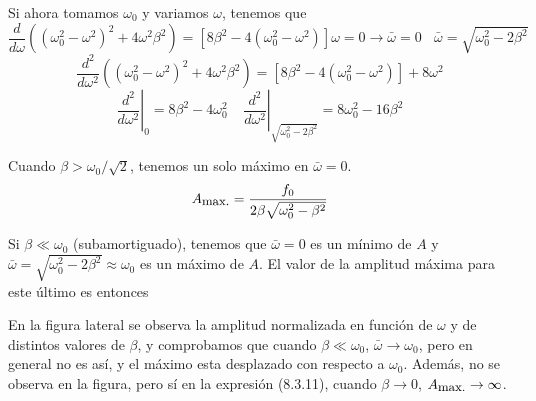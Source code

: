 Si ahora tomamos $\omega_0$ y variamos $\omega$, tenemos que
\begin{equation} \label{6.1.1}
    \frac{d}{d \omega} \left(\left(\omega_0^2 -\omega^2\right)^2+4\omega^2 \beta^2\right) =\left[8\beta^2-4\left(\omega_0^2 -\omega^2\right)\right]\omega = 0   \rightarrow \bar{\omega} = 0 \ \ \ \ \bar{\omega} =  \sqrt{\omega_0^2-2\beta^2}
\end{equation}
\[
    \frac{d^2}{d \omega^2} \left(\left(\omega_0^2 -\omega^2\right)^2+4\omega^2 \beta^2\right) = \left[8\beta^2-4\left(\omega_0^2 -\omega^2\right)\right] + 8\omega^2
\]
\begin{equation} \label{6.1.1}
    \left.\frac{d^2}{d \omega^2}\right|_0 = 8\beta^2 - 4\omega_0^2  \ \ \ \ \ \left.\frac{d^2}{d \omega^2}\right|_{\sqrt{\omega_0^2-2\beta^2}} = 8\omega_0^2-16\beta^2
\end{equation}
Cuando $\beta > \omega_0 /\sqrt{2}$, tenemos un solo máximo en $\bar{\omega} = 0$.
\begin{equation} \label{6.1.1}
    A_{\mbox{\small max.}} = \frac{f_0}{2\beta \sqrt{\omega_0^2-\beta^2}}
\end{equation}

Si $\beta \ll \omega_0$ (subamortiguado), tenemos que $\bar{\omega} = 0$ es un mínimo de $A$ y $\bar{\omega} = \sqrt{\omega_0^2-2\beta^2} \approx \omega_0$ es un máximo de $A$. El valor de la amplitud máxima para este último es entonces

En la figura lateral se observa la amplitud normalizada en función de  $\omega$ y de distintos valores de $\beta$, y comprobamos que cuando $\beta \ll \omega_0$, $\bar{\omega} \rightarrow \omega_0$, pero en general no es así, y el máximo esta desplazado con respecto a $\omega_0$.
Además, no se observa en la figura, pero sí en la expresión (8.3.11), cuando $\beta \rightarrow 0$, $A_{\mbox{\small max.}} \rightarrow \infty$.
\newpage
